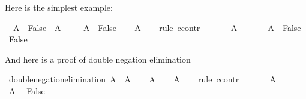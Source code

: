 \begin{isabellebody}
\begin{isamarkuptext}
Here is the simplest example:%
\end{isamarkuptext}\isamarkuptrue%
\isamarkupfalse%
\ {\isachardoublequoteopen}{\isacharparenleft}{\isasymnot}\ A\ {\isasymlongrightarrow}\ False{\isacharparenright}\ {\isasymlongrightarrow}\ A{\isachardoublequoteclose}\isanewline
%
\isadelimproof
%
\endisadelimproof
%
\isatagproof
{}\isamarkupfalse%
\isanewline
\ \ \isamarkupfalse%
\ {\isachardoublequoteopen}{\isasymnot}\ A\ {\isasymlongrightarrow}\ False{\isachardoublequoteclose}\isanewline
\ \ \isamarkupfalse%
\ {\isachardoublequoteopen}A{\isachardoublequoteclose}\isanewline
\ \ \isamarkupfalse%
\ {\isacharparenleft}rule\ ccontr{\isacharparenright}\isanewline
\ \ \ \ \isamarkupfalse%
\ {\isachardoublequoteopen}{\isasymnot}\ A{\isachardoublequoteclose}\isanewline
\ \ \ \ \isamarkupfalse%
\ {\isacharbackquoteopen}{\isasymnot}\ A\ {\isasymlongrightarrow}\ False{\isacharbackquoteclose}\ \isamarkupfalse%
\ {\isachardoublequoteopen}False{\isachardoublequoteclose}\isacommand{{\isachardot}{\isachardot}}\isamarkupfalse%
\isanewline
\ \ \isamarkupfalse%
\isanewline
{}\isamarkupfalse%
%
\endisatagproof
{\isafoldproof}%
%
\isadelimproof
%
\endisadelimproof
%
\begin{isamarkuptext}%
And here is a proof of double negation elimination%
\end{isamarkuptext}\isamarkuptrue%
\isamarkupfalse%
\ double{\isacharunderscore}negation{\isacharunderscore}elimination{\isacharcolon}\ {\isachardoublequoteopen}{\isasymnot}{\isasymnot}A\ {\isasymlongrightarrow}\ A{\isachardoublequoteclose}\isanewline
%
\isadelimproof
%
\endisadelimproof
%
\isatagproof
{}\isamarkupfalse%
\isanewline
\ \ \isamarkupfalse%
\ {\isachardoublequoteopen}{\isasymnot}{\isasymnot}A{\isachardoublequoteclose}\isanewline
\ \ \isamarkupfalse%
\ {\isachardoublequoteopen}A{\isachardoublequoteclose}\isanewline
\ \ \isamarkupfalse%
\ {\isacharparenleft}rule\ ccontr{\isacharparenright}\isanewline
\ \ \ \ \isamarkupfalse%
\ {\isachardoublequoteopen}{\isasymnot}\ A{\isachardoublequoteclose}\isanewline
\ \ \ \ \isamarkupfalse%
\ {\isacharbackquoteopen}{\isasymnot}{\isasymnot}A{\isacharbackquoteclose}\ \isamarkupfalse%
\ {\isachardoublequoteopen}False{\isachardoublequoteclose}\isacommand{{\isachardot}{\isachardot}}\isamarkupfalse%

\end{isabellebody}
